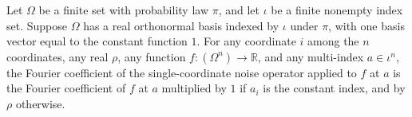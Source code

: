 \begin{theorem}
\label{FABL.FiniteFourierBasis.fourierCoeff_productSingleCoordinateNoiseOperator}
\leanok
{}
Let $\Omega$ be a finite set with probability law $\pi$, and let $\iota$ be a finite
nonempty index set. Suppose $\Omega$ has a real orthonormal basis indexed by $\iota$
under $\pi$, with one basis vector equal to the constant function $1$. For any
coordinate $i$ among the $n$ coordinates, any real $\rho$, any function
$f:(\Omega^n)\to\mathbb R$, and any multi-index $a\in\iota^n$, the Fourier coefficient
of the single-coordinate noise operator applied to $f$ at $a$ is the Fourier coefficient
of $f$ at $a$ multiplied by $1$ if $a_i$ is the constant index, and by $\rho$ otherwise.
\end{theorem}

